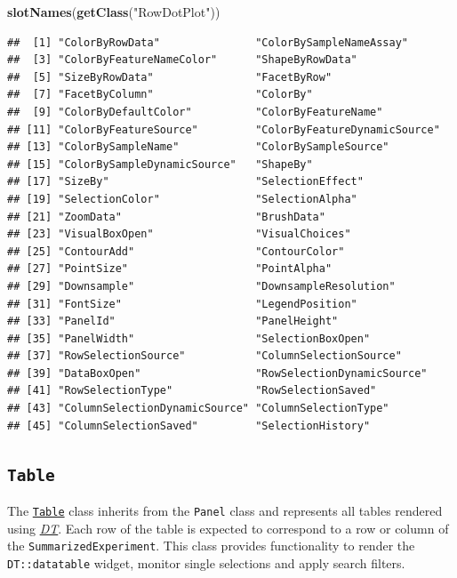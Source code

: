 \documentclass[
]{book}
\newenvironment{Shaded}{\begin{snugshade}}{\end{snugshade}}
\newcommand{\KeywordTok}[1]{\textcolor[rgb]{0.13,0.29,0.53}{\textbf{#1}}}
\newcommand{\NormalTok}[1]{#1}
\newcommand{\StringTok}[1]{\textcolor[rgb]{0.31,0.60,0.02}{#1}}
\begin{document}
\begin{Shaded}
\begin{Highlighting}[]
\KeywordTok{slotNames}\NormalTok{(}\KeywordTok{getClass}\NormalTok{(}\StringTok{"RowDotPlot"}\NormalTok{))}
\end{Highlighting}
\end{Shaded}

\begin{verbatim}
##  [1] "ColorByRowData"               "ColorBySampleNameAssay"      
##  [3] "ColorByFeatureNameColor"      "ShapeByRowData"              
##  [5] "SizeByRowData"                "FacetByRow"                  
##  [7] "FacetByColumn"                "ColorBy"                     
##  [9] "ColorByDefaultColor"          "ColorByFeatureName"          
## [11] "ColorByFeatureSource"         "ColorByFeatureDynamicSource" 
## [13] "ColorBySampleName"            "ColorBySampleSource"         
## [15] "ColorBySampleDynamicSource"   "ShapeBy"                     
## [17] "SizeBy"                       "SelectionEffect"             
## [19] "SelectionColor"               "SelectionAlpha"              
## [21] "ZoomData"                     "BrushData"                   
## [23] "VisualBoxOpen"                "VisualChoices"               
## [25] "ContourAdd"                   "ContourColor"                
## [27] "PointSize"                    "PointAlpha"                  
## [29] "Downsample"                   "DownsampleResolution"        
## [31] "FontSize"                     "LegendPosition"              
## [33] "PanelId"                      "PanelHeight"                 
## [35] "PanelWidth"                   "SelectionBoxOpen"            
## [37] "RowSelectionSource"           "ColumnSelectionSource"       
## [39] "DataBoxOpen"                  "RowSelectionDynamicSource"   
## [41] "RowSelectionType"             "RowSelectionSaved"           
## [43] "ColumnSelectionDynamicSource" "ColumnSelectionType"         
## [45] "ColumnSelectionSaved"         "SelectionHistory"
\end{verbatim}

\hypertarget{table}{%
\subsection{\texorpdfstring{\texttt{Table}}{Table}}\label{table}}

The \href{https://isee.github.io/iSEE/reference/Table-class.html}{\texttt{Table}} class inherits from the \texttt{Panel} class and represents all tables rendered using \emph{\href{https://CRAN.R-project.org/package=DT}{DT}}.
Each row of the table is expected to correspond to a row or column of the \texttt{SummarizedExperiment}.
This class provides functionality to render the \texttt{DT::datatable} widget, monitor single selections and apply search filters.
\end{document}
